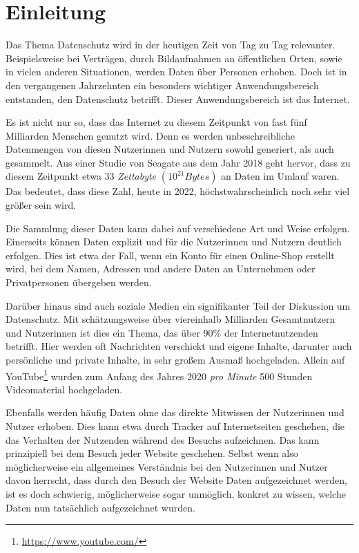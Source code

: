\section{Einleitung}

Das Thema Datenschutz wird in der heutigen Zeit von Tag zu Tag relevanter.
Beispielsweise bei Verträgen, durch Bildaufnahmen an öffentlichen Orten, sowie in vielen anderen 
Situationen, werden Daten über Personen erhoben.
Doch ist in den vergangenen Jahrzehnten ein besonders wichtiger Anwendungsbereich entstanden, den Datenschutz betrifft.
Dieser Anwendungsbereich ist das Internet.

Es ist nicht nur so, dass das Internet zu diesem Zeitpunkt von fast fünf Milliarden Menschen genutzt wird. \cite{kemp_digital_2022}
Denn es werden unbeschreibliche Datenmengen von diesen Nutzerinnen und Nutzern sowohl generiert, als auch gesammelt. 
Aus einer Studie von Seagate aus dem Jahr 2018 geht hervor, dass zu diesem Zeitpunkt etwa 33 \emph{Zettabyte} $(10^{21} Bytes)$ an Daten im Umlauf waren. \cite{reinsel_digitization_2018}
Das bedeutet, dass diese Zahl, heute in 2022, höchstwahrscheinlich noch sehr viel größer sein wird.

Die Sammlung dieser Daten kann dabei auf verschiedene Art und Weise erfolgen.
Einerseits können Daten explizit und für die Nutzerinnen und Nutzern deutlich erfolgen. 
Dies ist etwa der Fall, wenn ein Konto für einen Online-Shop erstellt wird, bei dem Namen, Adressen und andere Daten an Unternehmen oder Privatpersonen übergeben werden. 

Darüber hinaus sind auch soziale Medien ein signifikanter Teil der Diskussion um Datenschutz.
Mit schätzungsweise über viereinhalb Milliarden Gesamtnutzern und Nutzerinnen \cite{kemp_digital_2022} ist dies ein Thema, das über $90\%$ der Internetnutzenden betrifft.  
Hier werden oft Nachrichten verschickt und eigene Inhalte, darunter auch persönliche und private Inhalte, in sehr großem Ausmaß hochgeladen. Allein auf YouTube\footnote{\url{https://www.youtube.com/}} wurden zum Anfang des Jahres 2020 \emph{pro Minute} 500 Stunden Videomaterial hochgeladen. \cite{wojcicki_youtube_2020}

Ebenfalls werden häufig Daten ohne das direkte Mitwissen der Nutzerinnen und Nutzer erhoben.
Dies kann etwa durch Tracker auf Internetseiten geschehen, die das Verhalten der Nutzenden während des Besuchs aufzeichnen. 
Das kann prinzipiell bei dem Besuch jeder Website geschehen. 
Selbst wenn also möglicherweise ein allgemeines Verständnis bei den Nutzerinnen und Nutzer davon herrscht, dass durch den Besuch der Website Daten aufgezeichnet werden, 
ist es doch schwierig, möglicherweise sogar unmöglich, konkret zu wissen, welche Daten nun tatsächlich aufgezeichnet wurden.

